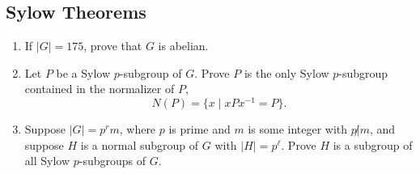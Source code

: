 \subsection*{\llap{\textcolor{main}{IV.}\hspace{0.75em}}Sylow Theorems}

\begin{enumerate}[label=\textbf{\sffamily\color{main}\Alph*.}]
	\item If $|G|=175$, prove that $G$ is abelian.
	\item Let $P$ be a Sylow $p$-subgroup of $G$. Prove $P$ is the only Sylow $p$-subgroup contained in the normalizer of $P$,
	$$N(P)=\{x\mid xPx^{-1}=P\}.$$
	\item Suppose $|G|=p^rm$, where $p$ is prime and $m$ is some integer with $p\not|m$, and suppose $H$ is a normal subgroup of $G$ with $|H|=p^\ell$. Prove $H$ is a subgroup of all Sylow $p$-subgroups of $G$.
\end{enumerate}